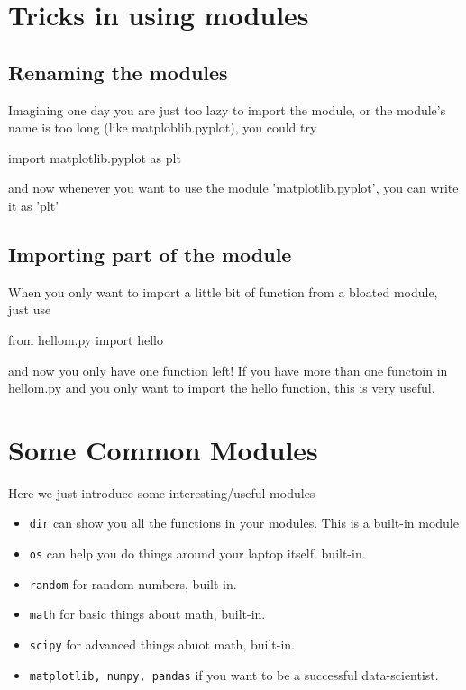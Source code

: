 \documentclass[12pt]{article}
\begin{document}
\section{Tricks in using modules}
\subsection{Renaming the modules}
Imagining one day you are just too lazy to import the module, or the module's name is too long (like matploblib.pyplot), you could try
\begin{python}
	import  matplotlib.pyplot as plt
\end{python}
and now whenever you want to use the module 'matplotlib.pyplot', you can write it as 'plt'
\subsection{Importing part of the module}
When you only want to import a little bit of function from a bloated module, just use
\begin{python}
	from hellom.py import hello
\end{python}
and now you only have one function left! If you have more than one functoin in hellom.py and you only want to import the hello function, this is very useful.
\section{Some Common Modules}
Here we just introduce some interesting/useful modules
\begin{itemize}
	\item \texttt{dir} can show you all the functions in your modules. This is a built-in module
	\item \texttt{os} can help you do things around your laptop itself. built-in.
	\item \texttt{random} for random numbers, built-in.
	\item \texttt{math} for basic things about math, built-in.
	\item \texttt{scipy} for advanced things abuot math, built-in.
	\item \texttt{matplotlib, numpy, pandas} if you want to be a successful data-scientist.
\end{itemize}
\end{document}
